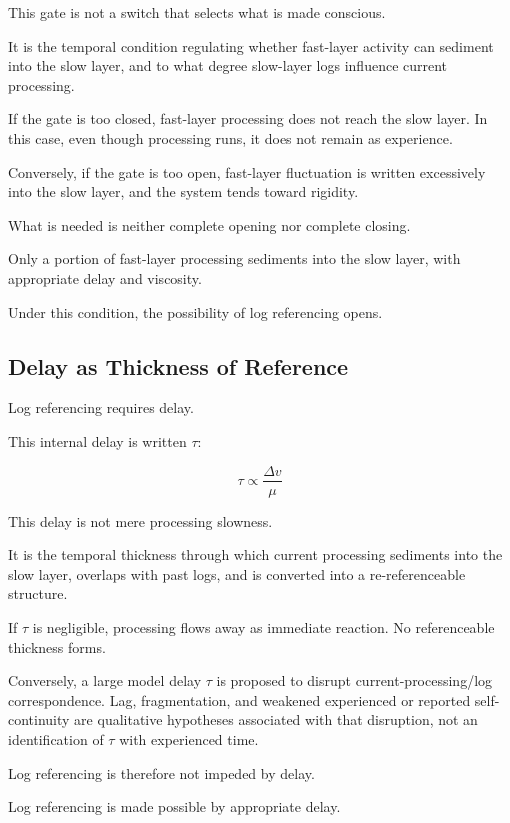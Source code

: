 This gate is not a switch that selects what is made conscious.

It is the temporal condition regulating whether fast-layer activity can sediment into the slow layer, and to what degree slow-layer logs influence current processing.

If the gate is too closed, fast-layer processing does not reach the slow layer. In this case, even though processing runs, it does not remain as experience.

Conversely, if the gate is too open, fast-layer fluctuation is written excessively into the slow layer, and the system tends toward rigidity.

What is needed is neither complete opening nor complete closing.

Only a portion of fast-layer processing sediments into the slow layer, with appropriate delay and viscosity.

Under this condition, the possibility of log referencing opens.

\subsection{Delay as Thickness of Reference}


Log referencing requires delay.

This internal delay is written $\tau$:

\begin{equation}
\tau \propto \frac{\Delta v}{\mu}
\end{equation}

This delay is not mere processing slowness.

It is the temporal thickness through which current processing sediments into the slow layer, overlaps with past logs, and is converted into a re-referenceable structure.

If $\tau$ is negligible, processing flows away as immediate reaction. No referenceable thickness forms.

Conversely, a large model delay $\tau$ is proposed to disrupt current-processing/log correspondence. Lag, fragmentation, and weakened experienced or reported self-continuity are qualitative hypotheses associated with that disruption, not an identification of $\tau$ with experienced time.

Log referencing is therefore not impeded by delay.

Log referencing is made possible by appropriate delay.

